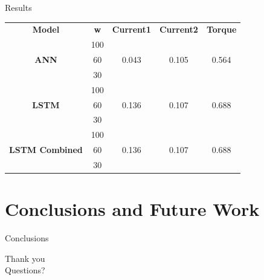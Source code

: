 \documentclass[handout]{beamer}
\begin{document}
\begin{frame}{Results}
\begin{table}[]
  \toprule
  \begin{tabular}{c c c c c}
   \textbf{Model} & \textbf{w} & \textbf{Current1} & \textbf{Current2} & \textbf{Torque}\\
   & 100 & & & \\
   \textbf{ANN} & 60 & 0.043 & 0.105 & 0.564 \\
   & 30 & & & \\
   & 100 & & & \\
   \textbf{LSTM} & 60 & 0.136 & 0.107 & 0.688 \\
   & 30 & & & \\
   & 100 & & & \\
   \textbf{LSTM Combined} & 60 & 0.136 & 0.107 & 0.688 \\
   & 30 & & & \\
  \end{tabular}
  \end{table}
\end{frame}
%


\section{Conclusions and Future Work}
\begin{frame}{Conclusions}

\end{frame}

\begin{frame}
\huge{Thank you}\\
\huge{Questions?}\\
\end{frame}
\end{document}

